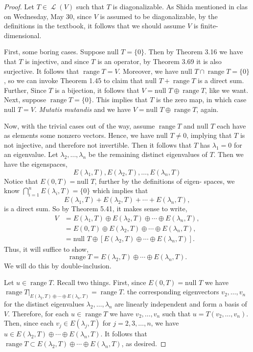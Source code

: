 \documentclass[letterpaper, 12pt]{amsart}
\DeclareMathOperator{\Ell}{\mathscr{L}}				%
\renewcommand{\null}{\text{null }}					%
\DeclareMathOperator{\range}{\text{range }}			%
\theoremstyle{definition}  							%
\begin{document}
		\begin{proof}
		Let $T \in \Ell(V)$ such that $T$ is diagonalizable.
		As Shida mentioned in clas on Wednesday, May 30, since $V$ is assumed to be diagonalizable, by the definitions in the textbook, it follows that we should assume $V$ is finite-dimensional.

		First, some boring cases.
		Suppose $\null T = \{ 0 \}$.
		Then by Theorem 3.16 we have that $T$ is injective, and since $T$ is an operator, by Theorem 3.69 it is also surjective.
		It follows that $\range T = V$.
		Moreover, we have $\null T \cap \range T = \{ 0 \}$, so we can invoke Theorem 1.45 to claim that $\null T + \range T$ is a direct sum.
		Further, Since $T$ is a bijection, it follows that $V = \null T \oplus \range T$, like we want.
		Next, suppose $\range T = \{ 0 \}$.
		This implies that $T$ is the zero map, in which case $\null T = V$.
		\textit{Mutatis mutandis} and we have $V = \null T \oplus \range T$, again.

		Now, with the trivial cases out of the way, assume $\range T$ and $\null T$ each have as elements some nonzero vectors.
		Hence, we have $\null T \neq 0$, implying that $T$ is not injective, and therefore not invertible.
		Then it follows that $T$ has $\lambda_{1} = 0$ for an eigenvalue.
		Let $\lambda_{2}, \dots, \lambda_{n}$ be the remaining distinct eigenvalues of $T$.
		Then we have the eigenspaces, $$E(\lambda_{1}, T), E(\lambda_{2},T), \dots, E(\lambda_{n}, T)$$
		Notice that $E(0,T) = \null T$, further by the definitions of eigen-
		spaces, we know $\bigcap_{i=1}^{n} E(\lambda_{i},T) = \{ 0 \}$ which implies that $$E(\lambda_{1}, T) + E(\lambda_{2},T) + \cdots + E(\lambda_{n}, T),$$ is a direct sum.
		So by Theorem 5.41, it makes sense to write,
			\begin{align*}
				V &= E(\lambda_{1}, T) \oplus E(\lambda_{2},T) \oplus \cdots \oplus E(\lambda_{n}, T), \\
				&= E(0, T) \oplus E(\lambda_{2},T) \oplus \cdots \oplus E(\lambda_{n}, T), \\
				&= \null T \oplus \left[ E(\lambda_{2},T) \oplus \cdots \oplus E(\lambda_{n}, T) \right].
			\end{align*}
		Thus, it will suffice to show, $$\range T = E(\lambda_{2},T) \oplus \cdots \oplus E(\lambda_{n}, T).$$
		We will do this by double-inclusion.

		Let $u \in \range T$.
		Recall two things.
		First, since $E(0,T) = \null T$ we have $\range T|_{E(\lambda_{2},T) \oplus \cdots \oplus E(\lambda_{n}, T)} = \range T$.
		 the corresponding eigenvectors $v_{2}, \dots, v_{n}$ for the distinct eigenvalues $\lambda_{2}, \dots, \lambda_{n}$ are linearly independent and form a basis of $V$.
		Therefore, for each $u \in \range T$ we have $v_{2}, \dots, v_{n}$ such that $u = T(v_{2}, \dots, v_{n})$.
		Then, since each $v_{j} \in E(\lambda_{j},T)$ for $j = 2,3,\dots,n$, we have $u \in E(\lambda_{2},T) \oplus \cdots \oplus E(\lambda_{n}, T)$.
		It follows that $\range T \subset E(\lambda_{2},T) \oplus \cdots \oplus E(\lambda_{n}, T)$, as desired.


\end{proof}
\end{document}
